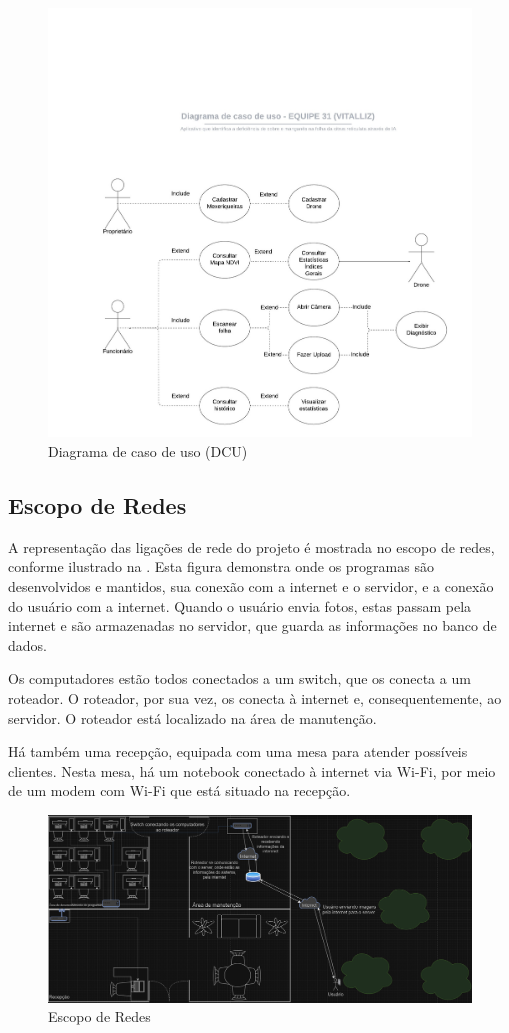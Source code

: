 \documentclass[
  a4paper,%
  12pt,%
  english,%
  brazilian,%
]{article}
\begin{document}
\begin{figure}[H]
\centering
\caption{Diagrama de caso de uso (DCU)}%
\label{fig:dcu}
\includegraphics[width=0.8\linewidth]{Logos/dcu.jpeg}
\end{figure}

\subsection*{\textbf{Escopo de Redes}}

A representação das ligações de rede do projeto é mostrada no escopo de redes, conforme ilustrado na . Esta figura demonstra onde os programas são desenvolvidos e mantidos, sua conexão com a internet e o servidor, e a conexão do usuário com a internet. Quando o usuário envia fotos, estas passam pela internet e são armazenadas no servidor, que guarda as informações no banco de dados.

Os computadores estão todos conectados a um switch, que os conecta a um roteador. O roteador, por sua vez, os conecta à internet e, consequentemente, ao servidor. O roteador está localizado na área de manutenção.

Há também uma recepção, equipada com uma mesa para atender possíveis clientes. Nesta mesa, há um notebook conectado à internet via Wi-Fi, por meio de um modem com Wi-Fi que está situado na recepção.

\begin{figure}[H]
\centering
\caption{Escopo de Redes}%
\label{fig:escopoderedes}
\includegraphics[width=0.8\linewidth]{Logos/escopoderedes.png}
\end{figure}
\end{document}
